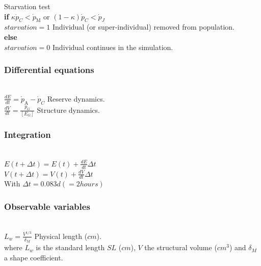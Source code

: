 Starvation test\\

\textbf{if} $\kappa \dot{p}_{C} < \dot{p}_\mathrm{M}$ or $\left ( 1- \kappa \right ) \dot{p}_{C} < \dot{p}_{J}$\\

$starvation = 1$ \hfill Individual (or super-individual) removed from population.\\

\textbf{else}\\

$starvation = 0$ \hfill Individual continues in the simulation.\\

\subsubsection{Differential equations}\label{Chap3DiffEq}
\hfill \\

$\frac{dE}{dt} = \dot{p}_\mathrm{A} - \dot{p}_{C}$ \hfill Reserve dynamics.\\

$\frac{dV}{dt} = \frac{\dot{p}_{G}}{\left[ E_{G} \right]}$ \hfill Structure dynamics.\\

\subsubsection{Integration}\label{Chap3Integ}
\hfill \\
$E\left ( t + \Delta t \right ) = E\left ( t \right ) + \frac{dE}{dt}\Delta t$ \\

$V\left ( t + \Delta t \right ) = V\left ( t \right ) + \frac{dV}{dt}\Delta t$ \\

With $\Delta t = 0.083 d \left (=2hours\right )$

\subsubsection{Observable variables}\label{Chap3ObsVar}
\hfill \\
$L_{w} = \frac{V^{1/3}}{\delta_{M}}$ \hfill Physical length ($cm$).\\

where $L_{w}$ is the standard length $SL$ ($cm$), $V$ the structural volume ($cm^3$) and $\delta_{M}$ a shape coefficient.\\

